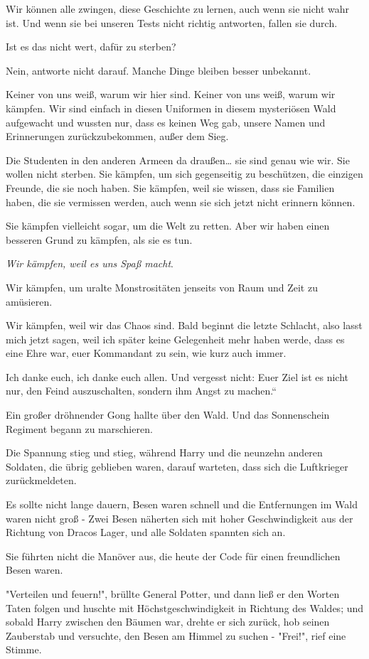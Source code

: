{Wir können alle zwingen, diese Geschichte zu lernen, auch wenn sie nicht wahr ist. Und wenn sie bei unseren Tests nicht richtig antworten, fallen sie durch.

Ist es das nicht wert, dafür zu sterben?

Nein, antworte nicht darauf. Manche Dinge bleiben besser unbekannt.

Keiner von uns weiß, warum wir hier sind. Keiner von uns weiß, warum wir kämpfen. Wir sind einfach in diesen Uniformen in diesem mysteriösen Wald aufgewacht und wussten nur, dass es keinen Weg gab, unsere Namen und Erinnerungen zurückzubekommen, außer dem Sieg.

Die Studenten in den anderen Armeen da draußen… sie sind genau wie wir. Sie wollen nicht sterben. Sie kämpfen, um sich gegenseitig zu beschützen, die einzigen Freunde, die sie noch haben. Sie kämpfen, weil sie wissen, dass sie Familien haben, die sie vermissen werden, auch wenn sie sich jetzt nicht erinnern können.

Sie kämpfen vielleicht sogar, um die Welt zu retten. Aber wir haben einen besseren Grund zu kämpfen, als sie es tun.

\emph{Wir kämpfen, weil es uns Spaß macht}.

Wir kämpfen, um uralte Monstrositäten jenseits von Raum und Zeit zu amüsieren.

Wir kämpfen, weil wir das Chaos sind. Bald beginnt die letzte Schlacht, also lasst mich jetzt sagen, weil ich später keine Gelegenheit mehr haben werde, dass es eine Ehre war, euer Kommandant zu sein, wie kurz auch immer.

Ich danke euch, ich danke euch allen. Und vergesst nicht: Euer Ziel ist es nicht nur, den Feind auszuschalten, sondern ihm Angst zu machen.“

Ein großer dröhnender Gong hallte über den Wald. Und das Sonnenschein Regiment begann zu marschieren.

Die Spannung stieg und stieg, während Harry und die neunzehn anderen Soldaten, die übrig geblieben waren, darauf warteten, dass sich die Luftkrieger zurückmeldeten.

Es sollte nicht lange dauern, Besen waren schnell und die Entfernungen im Wald waren nicht groß - Zwei Besen näherten sich mit hoher Geschwindigkeit aus der Richtung von Dracos Lager, und alle Soldaten spannten sich an.

Sie führten nicht die Manöver aus, die heute der Code für einen freundlichen Besen waren.

"Verteilen und feuern!", brüllte General Potter, und dann ließ er den Worten Taten folgen und huschte mit Höchstgeschwindigkeit in Richtung des Waldes; und sobald Harry zwischen den Bäumen war, drehte er sich zurück, hob seinen Zauberstab und versuchte, den Besen am Himmel zu suchen - "Frei!", rief eine Stimme.

}
